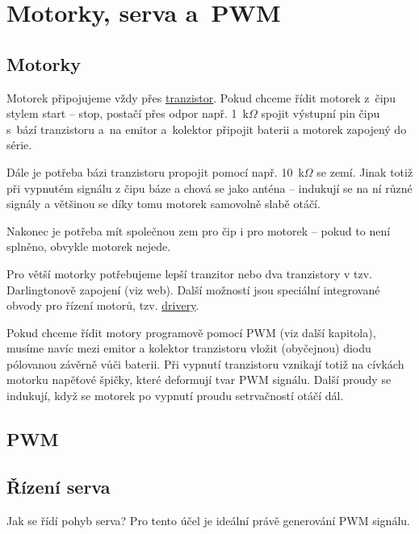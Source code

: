 \section{Motorky, serva a~PWM}

\subsection{Motorky}

Motorek připojujeme vždy přes    \hyperlink{tranzistor}{tranzistor}. 
Pokud chceme řídit motorek z~čipu stylem start -- stop, postačí přes odpor 
např. 1~k$\Omega$ spojit výstupní pin čipu s~bází tranzistoru a~na emitor a~kolektor připojit baterii a motorek zapojený do série. 

Dále je potřeba bázi tranzistoru propojit pomocí např. 10~k$\Omega$ se zemí. 
Jinak totiž při vypnutém signálu z čipu báze  a chová se jako 
anténa -- indukují se na ní různé signály a většinou se díky tomu motorek samovolně slabě otáčí.   

Nakonec je potřeba mít společnou zem pro čip i pro motorek -- pokud to není splněno, obvykle motorek nejede. 

Pro větší motorky potřebujeme lepší tranzitor nebo dva tranzistory v tzv. Darlingtonově zapojení (viz web). 
Další možností jsou speciální integrované obvody pro řízení motorů, tzv.  
 \hyperlink{drivery}{drivery}.  

Pokud chceme řídit motory programově pomocí PWM (viz další kapitola), 
musíme navíc mezi emitor a kolektor tranzistoru vložit (obyčejnou) diodu pólovanou závěrně vůči baterii. 
Při vypnutí tranzistoru vznikají totiž na cívkách motorku napěťové špičky, které deformují tvar PWM signálu.  
Další proudy se indukují, když se motorek po vypnutí proudu setrvačností otáčí dál. 

\subsection{PWM}


\subsection{Řízení serva}

 Jak se řídí pohyb serva? Pro tento účel je ideální právě generování PWM signálu. 

